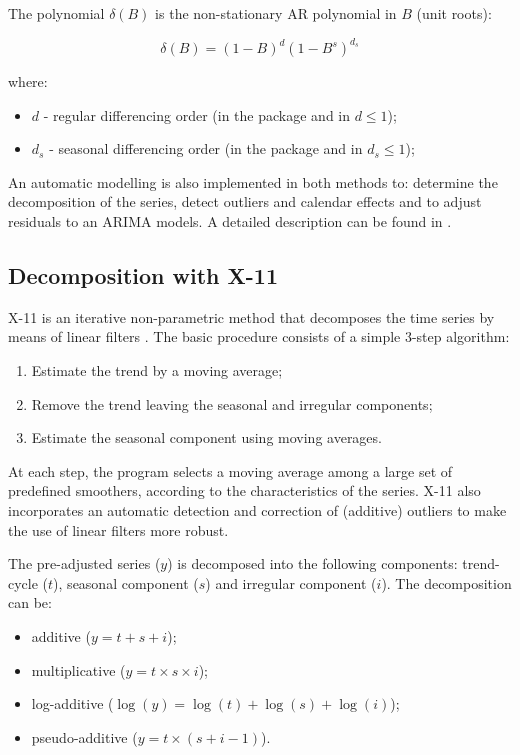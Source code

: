 \documentclass[article]{jss}
\providecommand{\tightlist}{%
  \setlength{\itemsep}{0pt}\setlength{\parskip}{0pt}}
\begin{document}
The polynomial \(\delta(B)\) is the non-stationary AR polynomial in
\(B\) (unit roots):

\[\delta(B)=(1-B)^d(1-B^s)^{d_s}\]

where:

\begin{itemize}
\tightlist
\item
  \(d\) - regular differencing order (in the package and in
   \(d \le 1\));
\item
  \(d_s\) - seasonal differencing order (in the package and in
   \(d_s \le 1\));
\end{itemize}

An automatic modelling is also implemented in both methods to: determine
the decomposition of the series, detect outliers and calendar effects
and to adjust residuals to an ARIMA models. A detailed description can
be found in \cite{gomez1998automatic}.

\hypertarget{sa-x11}{%
\subsection{Decomposition with X-11}\label{sa-x11}}

X-11 is an iterative non-parametric method that decomposes the time
series by means of linear filters \citep{findleyx12, ladiray1999x11en}.
The basic procedure consists of a simple 3-step algorithm:

\begin{enumerate}
\def\labelenumi{\arabic{enumi})}
\tightlist
\item
  Estimate the trend by a moving average;
\item
  Remove the trend leaving the seasonal and irregular components;
\item
  Estimate the seasonal component using moving averages.
\end{enumerate}

At each step, the program selects a moving average among a large set of
predefined smoothers, according to the characteristics of the series.
X-11 also incorporates an automatic detection and correction of
(additive) outliers to make the use of linear filters more robust.

The pre-adjusted series (\(y\)) is decomposed into the following
components: trend-cycle (\(t\)), seasonal component (\(s\)) and
irregular component (\(i\)). The decomposition can be:

\begin{itemize}
\tightlist
\item
  additive (\(y = t + s + i\));\\
\item
  multiplicative (\(y = t \times s \times i\));\\
\item
  log-additive (\(\log(y) = \log(t) + \log(s) + \log(i)\));\\
\item
  pseudo-additive (\(y = t \times (s + i - 1)\)).
\end{itemize}
\end{document}
